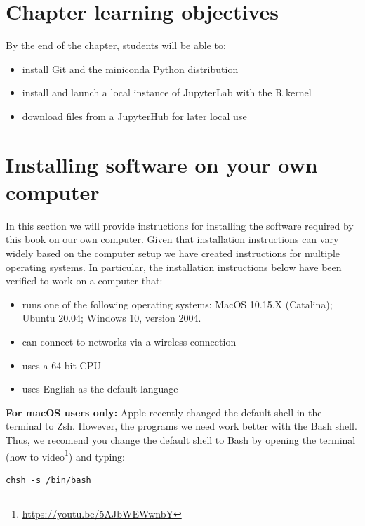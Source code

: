 \documentclass[
]{krantz}
\providecommand{\tightlist}{%
  \setlength{\itemsep}{0pt}\setlength{\parskip}{0pt}}
\renewcommand{\href}[2]{#2\footnote{\url{#1}}}
\begin{document}
\hypertarget{chapter-learning-objectives-10}{%
\section{Chapter learning objectives}\label{chapter-learning-objectives-10}}

By the end of the chapter, students will be able to:

\begin{itemize}
\tightlist
\item
  install Git and the miniconda Python distribution
\item
  install and launch a local instance of JupyterLab with the R kernel
\item
  download files from a JupyterHub for later local use
\end{itemize}

\hypertarget{installing-software-on-your-own-computer}{%
\section{Installing software on your own computer}\label{installing-software-on-your-own-computer}}

In this section we will provide instructions for installing the software
required by this book on our own computer.
Given that installation instructions can vary widely based on the computer setup
we have created instructions for multiple operating systems.
In particular, the installation instructions below have been verified to work
on a computer that:

\begin{itemize}
\tightlist
\item
  runs one of the following operating systems: MacOS 10.15.X (Catalina); Ubuntu 20.04; Windows 10, version 2004.
\item
  can connect to networks via a wireless connection
\item
  uses a 64-bit CPU
\item
  uses English as the default language
\end{itemize}

\textbf{For macOS users only:} Apple recently changed the default shell in the terminal to Zsh.
However, the programs we need work better with the Bash shell. Thus, we recomend you change
the default shell to Bash by opening the terminal
(\href{https://youtu.be/5AJbWEWwnbY}{how to video}) and typing:

\begin{verbatim}
chsh -s /bin/bash
\end{verbatim}
\end{document}
